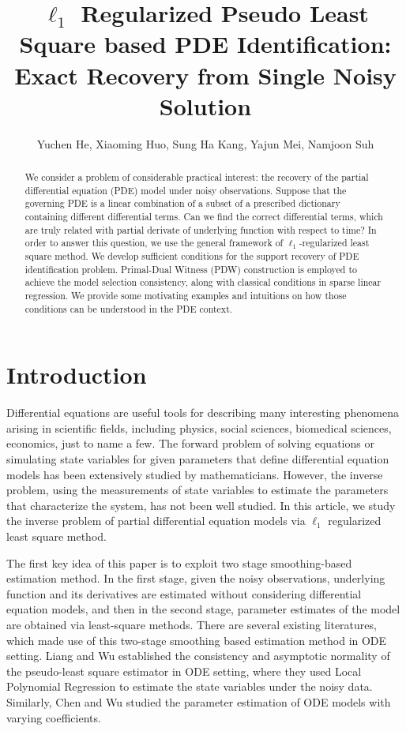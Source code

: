 \documentclass[a4paper,11pt]{article}
\begin{document}
\title{$\ell_1$ Regularized Pseudo Least Square based PDE Identification: Exact Recovery from Single Noisy Solution }
\author{Yuchen He, Xiaoming Huo, Sung Ha Kang, Yajun Mei, Namjoon Suh}
\maketitle
\begin{abstract}
We consider a problem of considerable practical interest: the recovery of the partial differential equation (PDE) model under noisy observations. Suppose that the governing PDE is a linear combination of a subset of a prescribed dictionary containing different differential terms. Can we find the correct differential terms, which are truly related with partial derivate of underlying function with respect to time? In order to answer this question, we use the general framework of $\ell_{1}$-regularized least square method. We develop sufficient conditions for the support recovery of PDE identification problem. Primal-Dual Witness (PDW) construction is employed to achieve the model selection consistency, along with classical conditions in sparse linear regression. We provide some motivating examples and intuitions on how those conditions can be understood in the PDE context. 
\end{abstract}
\section{Introduction}

Differential equations are useful tools for describing many interesting phenomena arising in scientific fields, including physics, social sciences, biomedical sciences, economics, just to name a few. The forward problem of solving equations or simulating state variables for given parameters that define differential equation models has been extensively studied by mathematicians. However, the inverse problem, using the measurements of state variables to estimate the parameters that characterize the system, has not been well studied. In this article, we study the inverse problem of partial differential equation models via $\ell_{1}$ regularized least square method. 

The first key idea of this paper is to exploit two stage smoothing-based estimation method. In the first stage, given the noisy observations, underlying function and its derivatives are estimated without considering differential equation models, and then in the second stage, parameter estimates of the model are obtained via least-square methods. There are several existing literatures, which made use of this two-stage smoothing based estimation method in ODE setting. Liang and Wu \cite{liang2008parameter} established the consistency and asymptotic normality of the pseudo-least square estimator in ODE setting, where they used Local Polynomial Regression to estimate the state variables under the noisy data. Similarly, Chen and Wu \cite{chen2008efficient,chen2008estimation} studied the parameter estimation of ODE models with varying coefficients. 
\end{document}
